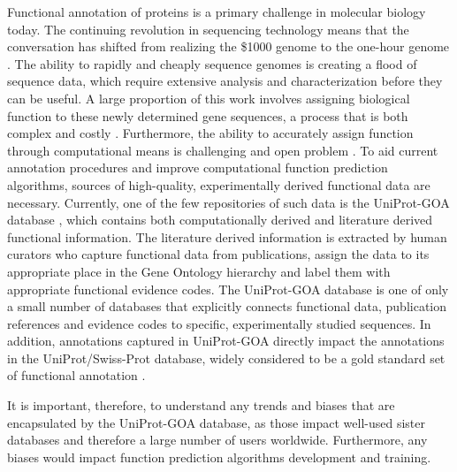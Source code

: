 \documentclass[12pt]{article}
\begin{document}
Functional annotation of proteins is a primary challenge in molecular biology
today\cite{Friedberg2006Automated,Erdin2011180,Rentzsch2009210}. The continuing revolution
in sequencing technology means that the conversation has shifted from realizing the \$1000
genome to the one-hour genome \cite{PMID Stahl2012Toward}. The ability to rapidly and
cheaply sequence genomes is creating a flood of sequence data, which require extensive
analysis and characterization before they can be useful.  A large proportion of this work
involves assigning biological function to these newly determined gene sequences, a process
that is both complex and costly \cite{Sboner2011Real}.  Furthermore,  the ability to
accurately assign function through computational means is challenging and open problem
\cite{Schnoes2009Annotation}. To aid current annotation procedures and improve computational
function prediction algorithms, sources of high-quality, experimentally derived functional
data are necessary.  Currently, one of the few repositories of such data is the UniProt-GOA
database \cite{Dimmer2012UniProtGO}, which contains both computationally derived and
literature derived functional information. The literature derived information is extracted
by human curators who capture functional data from publications, assign the data to its
appropriate place in the Gene Ontology hierarchy \cite{Ashburner2000Gene} and label them
with appropriate functional evidence codes. The UniProt-GOA database is one of only a small
number of databases that explicitly connects functional data, publication references and
evidence codes to specific, experimentally studied sequences.  In addition, annotations
captured in UniProt-GOA directly impact the annotations in the UniProt/Swiss-Prot database,
widely considered to be a gold standard set of functional annotation
\cite{Schnoes2009Annotation}. 

It is important, therefore, to understand any trends and biases that are
encapsulated by the UniProt-GOA database, as those impact well-used sister
databases and therefore a large number of users worldwide. Furthermore,
any biases would impact function prediction algorithms development and training.
\end{document}
